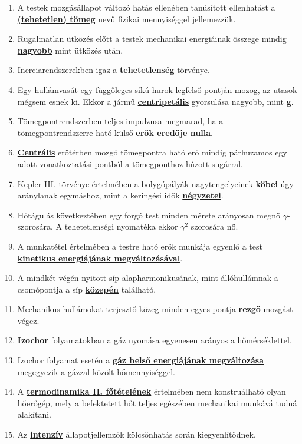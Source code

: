 \documentclass[../../fizika_kerdesek.tex]{subfiles}
\begin{document}
        \begin{enumerate}
            \item A testek mozgásállapot változó hatás ellenében tanúsított ellenhatást a \underline{\textbf{(tehetetlen) tömeg}} nevű fizikai mennyiséggel jellemezzük.
            \item Rugalmatlan ütközés előtt a testek mechanikai energiáinak összege mindig \underline{\textbf{nagyobb}} mint ütközés után.
            \item Inerciarendszerekben igaz a \underline{\textbf{tehetetlenség}} törvénye.
            \item Egy hullámvasút egy függőleges síkú hurok legfelső pontján mozog, az utasok mégsem esnek ki. Ekkor a jármű \underline{\textbf{centripetális}} gyorsulása nagyobb, mint \underline{\textbf{g}}.
            \item Tömegpontrendszerben teljes impulzusa megmarad, ha a tömegpontrendszerre ható külső \underline{\textbf{erők eredője nulla}}.
            \item \underline{\textbf{Centrális}} erőtérben mozgó tömegpontra ható erő mindig párhuzamos egy adott vonatkoztatási pontból a tömegponthoz húzott sugárral.
            \item Kepler III. törvénye értelmében a bolygópályák nagytengelyeinek \underline{\textbf{köbei}} úgy aránylanak egymáshoz, mint a keringési idők \underline{\textbf{négyzetei}}.
            \item Hőtágulás következtében egy forgó test minden mérete arányosan megnő $\gamma$-szorosára. A tehetetlenségi nyomatéka ekkor \underline{\textbf{$\gamma^2$}} szorosára nő.
            \sloppy\item A munkatétel értelmében a testre ható erők munkája egyenlő a test \underline{\textbf{kinetikus energiájának megváltozásával}}.
            \item A mindkét végén nyitott síp alapharmonikusának, mint állóhullámnak a csomópontja a síp \underline{\textbf{közepén}} található.
            \item Mechanikus hullámokat terjesztő közeg minden egyes pontja \underline{\textbf{rezgő}} mozgást végez.
            \item \underline{\textbf{Izochor}} folyamatokban a gáz nyomása egyenesen arányos a hőmérséklettel.
            \item Izochor folyamat esetén a \underline{\textbf{gáz belső energiájának megváltozása}} megegyezik a gázzal közölt hőmennyiséggel.
            \item A \underline{\textbf{termodinamika II. főtételének}} értelmében nem konstruálható olyan hőerőgép, mely a befektetett hőt teljes egészében mechanikai munkává tudná alakítani.
            \item Az \underline{\textbf{intenzív}} állapotjellemzők kölcsönhatás során kiegyenlítődnek.
        \end{enumerate}


    \underline{\textbf{}}
\end{document}
